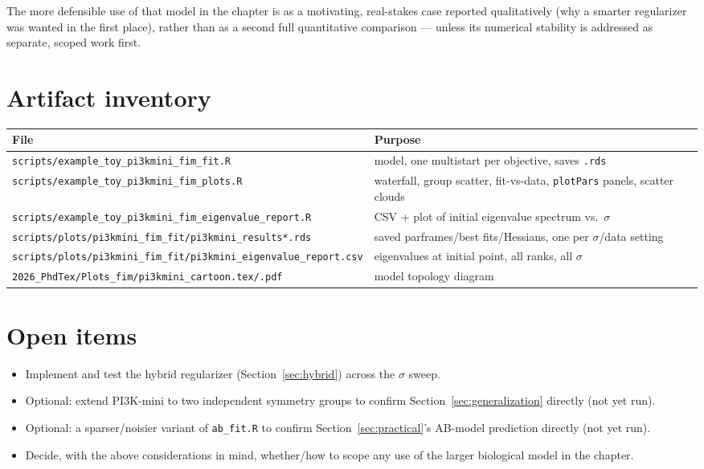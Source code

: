 \documentclass[11pt]{article}
\newcommand{\code}[1]{\texttt{#1}}
\newcommand{\file}[1]{\textcolor{black!60}{\texttt{#1}}}
\begin{document}
The more defensible use of that model in the chapter is as a motivating,
real-stakes case reported qualitatively (why a smarter regularizer was
wanted in the first place), rather than as a second full quantitative
comparison --- unless its numerical stability is addressed as separate,
scoped work first.

\section{Artifact inventory}

\begin{center}
\begin{tabular}{ll}
\toprule
File & Purpose \\
\midrule
\file{scripts/example\_toy\_pi3kmini\_fim\_fit.R} & model, one multistart per objective, saves \code{.rds} \\
\file{scripts/example\_toy\_pi3kmini\_fim\_plots.R} & waterfall, group scatter, fit-vs-data, \code{plotPars} panels, scatter clouds \\
\file{scripts/example\_toy\_pi3kmini\_fim\_eigenvalue\_report.R} & CSV + plot of initial eigenvalue spectrum vs.\ $\sigma$ \\
\file{scripts/plots/pi3kmini\_fim\_fit/pi3kmini\_results*.rds} & saved parframes/best fits/Hessians, one per $\sigma$/data setting \\
\file{scripts/plots/pi3kmini\_fim\_fit/pi3kmini\_eigenvalue\_report.csv} & eigenvalues at initial point, all ranks, all $\sigma$ \\
\file{2026\_PhdTex/Plots\_fim/pi3kmini\_cartoon.tex/.pdf} & model topology diagram \\
\bottomrule
\end{tabular}
\end{center}

\section{Open items}

\begin{itemize}
\item Implement and test the hybrid regularizer (Section~\ref{sec:hybrid}) across the $\sigma$ sweep.
\item Optional: extend PI3K-mini to two independent symmetry groups to confirm Section~\ref{sec:generalization} directly (not yet run).
\item Optional: a sparser/noisier variant of \code{ab\_fit.R} to confirm Section~\ref{sec:practical}'s AB-model prediction directly (not yet run).
\item Decide, with the above considerations in mind, whether/how to scope any use of the larger biological model in the chapter.
\end{itemize}
\end{document}
